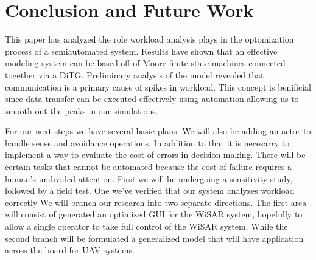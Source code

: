 \section{Conclusion and Future Work}
This paper has analyzed the role workload analysis plays in the optomization process of a semiautomated system. Results have shown that an effective modeling system can be based off of Moore finite state machines connected together via a DiTG. Preliminary analysis of the model revealed that communication is a primary cause of spikes in workload. This concept is benificial since data transfer can be executed effectively using automation allowing us to smooth out the peaks in our simulations.

For our next steps we have several basic plans. We will also be adding an actor to handle sense and avoidance operations. In addition to that it is necesarry to implement a way to evaluate the cost of errors in decision making. There will be certain tasks that cannot be automated because the cost of failure requires a human's undivided attention. First we will be undergoing a sensitivity study, followed by a field test. One we've verified that our system analyzes workload correctly We will branch our research into two separate directions. The first area will consist of generated an optimized GUI for the WiSAR system, hopefully to allow a single operator to take full control of the WiSAR system. While the second branch will be formulated a generalized model that will have application across the board for UAV systems.
